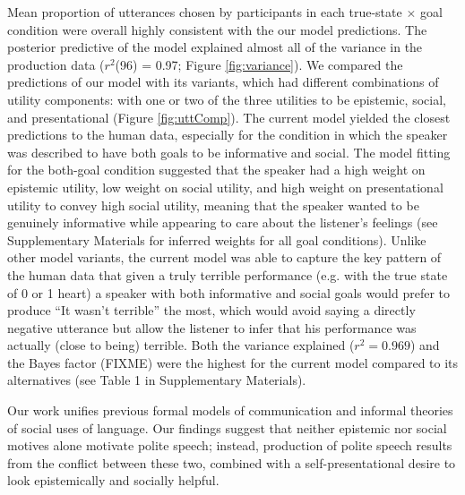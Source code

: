 \documentclass[12pt]{article}
\begin{document}
Mean proportion of utterances chosen by participants in each true-state \(\times\) goal condition were 
overall highly consistent with the our model predictions. 
The posterior predictive of the model explained almost all of the variance in the production data 
(\(r^2\)(96) = 0.97; Figure \ref{fig:variance}). 
We compared the predictions of our model with its variants, which had different combinations of utility components: 
with one or two of the three utilities to be epistemic, social, and presentational (Figure \ref{fig:uttComp}). 
The current model yielded the closest predictions to the human data, especially for the condition in which the speaker was described to have both goals to be informative and social.
The model fitting for the both-goal condition suggested that 
the speaker had a high weight on epistemic utility, low weight on social utility, 
and high weight on presentational utility to convey high social utility, 
meaning that the speaker wanted to be genuinely informative while appearing to care about the listener's feelings
(see Supplementary Materials for inferred weights for all goal conditions). 
Unlike other model variants, the current model was able to capture the key pattern of the human data 
that given a truly terrible performance (e.g. with the true state of 0 or 1 heart) a speaker with both informative and social goals would prefer to produce ``It wasn't terrible'' the most, 
which would avoid saying a directly negative utterance but allow the listener to infer that his performance was actually (close to being) terrible. 
Both the variance explained ($r^2 = 0.969$) and the Bayes factor (FIXME) were the highest 
for the current model compared to its alternatives (see Table 1 in Supplementary Materials).



Our work unifies previous formal models of communication and informal
theories of social uses of language. Our findings suggest that neither
epistemic nor social motives alone motivate polite speech; instead,
production of polite speech results from the conflict between these two,
combined with a self-presentational desire to look epistemically
and socially helpful. 
\end{document}
